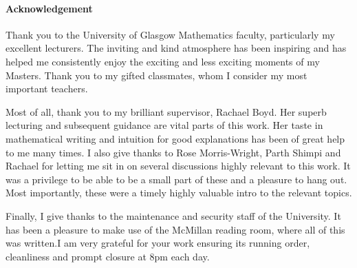 \documentclass[class=article, crop=false]{standalone}
\begin{document}
\paragraph{Acknowledgement}
Thank you to the University of Glasgow Mathematics faculty, particularly my excellent lecturers. The inviting and kind atmosphere has been inspiring and has helped me consistently enjoy the exciting and less exciting moments of my Masters. Thank you to my gifted classmates, whom I consider my most important teachers.

Most of all, thank you to my brilliant supervisor, Rachael Boyd. Her superb lecturing and subsequent guidance are vital parts of this work. Her taste in mathematical writing and intuition for good explanations has been of great help to me many times. I also give thanks to Rose Morris-Wright, Parth Shimpi and Rachael for letting me sit in on several discussions highly relevant to this work. It was a privilege to be able to be a small part of these and a pleasure to hang out. Most importantly, these were a timely highly valuable intro to the relevant topics.

Finally, I give thanks to the maintenance and security staff of the University. It has been a pleasure to make use of the McMillan reading room, where all of this was written.I am very grateful for your work ensuring its running order, cleanliness and prompt closure at 8pm each day.
\end{document}
